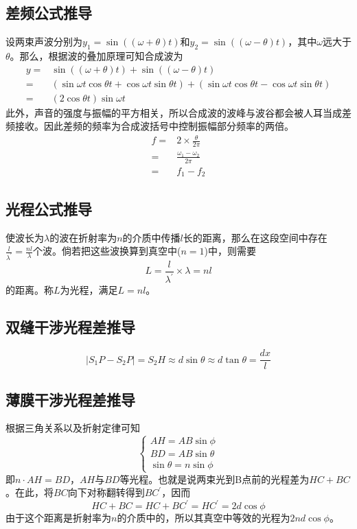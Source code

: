 \subsection{差频公式推导}

设两束声波分别为$y_1=\sin((\omega+\theta)t)$和$y_2=\sin((\omega-\theta)t)$，其中$\omega$远大于$\theta$。那么，根据波的叠加原理可知合成波为
\begin{align*}
    y=&\sin((\omega+\theta)t)+\sin((\omega-\theta)t)\\
    =&(\sin\omega t\cos\theta t+\cos\omega t\sin\theta t)+(\sin\omega t\cos\theta t-\cos\omega t\sin\theta t)\\
    =&(2\cos\theta t)\sin\omega t
\end{align*}
此外，声音的强度与振幅的平方相关，所以合成波的波峰与波谷都会被人耳当成差频接收。因此差频的频率为合成波括号中控制振幅部分频率的两倍。
\begin{align*}
    f=&2\times\frac{\theta}{2\pi}\\
    =&\frac{\omega_1-\omega_2}{2\pi}\\
    =&f_1-f_2
\end{align*}

\subsection{光程公式推导}

使波长为$\lambda$的波在折射率为$n$的介质中传播$l$长的距离，那么在这段空间中存在$\frac{l}{\lambda^\prime}=\frac{nl}{\lambda}$个波。倘若把这些波换算到真空中($n=1$)中，则需要
\begin{equation*}
    L=\frac{l}{\lambda^\prime}\times\lambda=nl
\end{equation*}
的距离。称$L$为光程，满足$L=nl$。

\subsection{双缝干涉光程差推导}

\begin{equation*}
    |S_1P-S_2P|=S_2H\approx d\sin\theta\approx d\tan\theta=\frac{dx}{l}
\end{equation*}

\subsection{薄膜干涉光程差推导}

根据三角关系以及折射定律可知
\begin{equation*}
    \begin{cases}
        AH=AB\sin\phi\\
        BD=AB\sin\theta\\
        \sin\theta=n\sin\phi
    \end{cases}
\end{equation*}
即$n\cdot AH=BD$，$AH$与$BD$等光程。也就是说两束光到B点前的光程差为$HC+BC$。在此，将$BC$向下对称翻转得到$BC^\prime$，因而
\begin{equation*}
    HC+BC=HC+BC^\prime=HC^\prime=2d\cos\phi
\end{equation*}
由于这个距离是折射率为$n$的介质中的，所以其真空中等效的光程为$2nd\cos\phi$。

